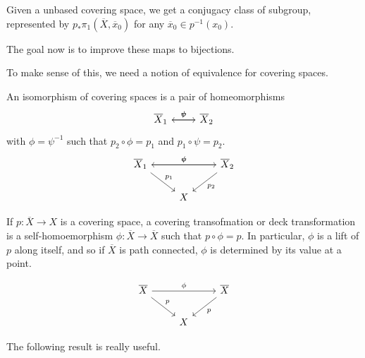 \documentclass{article}
\numberwithin{nthm}{subsection}
\begin{document}
Given a unbased covering space, we get a conjugacy class of subgroup, represented by $p_* \pi_1(\overline{X},\overline{x}_0)$ for any $\overline{x}_0 \in p^{-1}(x_0)$.

The goal now is to improve these maps to bijections.

To make sense of this, we need a notion of equivalence for covering spaces.

\begin{defi}
    An isomorphism of covering spaces is a pair of homeomorphisms
    \begin{equation*}
        \begin{tikzcd}
            \overline{X}_1 \arrow[r, "\phi"] & \overline{X}_2 \arrow[l, "\psi"']
        \end{tikzcd}
    \end{equation*}
    with $\phi = \psi^{-1}$ such that $p_2 \circ \phi = p_1$ and $p_1 \circ \psi = p_2$.
    \begin{equation*}
        \begin{tikzcd}
            \overline{X}_1 \arrow[rr, "\phi"] \arrow[rd, "p_1"] & & \overline{X}_2 \arrow[ll, "\psi"'] \arrow[ld, "p_2"] \\
                                             & X &
        \end{tikzcd}
    \end{equation*}
\end{defi}

\begin{defi}
    If $p: \overline{X} \to X$ is a covering space, a covering transofmation or deck transformation is a self-homoemorphism $\phi: \overline{X} \to \overline{X}$ such that $p \circ \phi = p$.
    In particular, $\phi$ is a lift of $p$ along itself, and so if $\overline{X}$ is path connected, $\phi$ is determined by its value at a point.

    \begin{equation*}
        \begin{tikzcd}
            \overline{X} \arrow[rr, "\phi"] \arrow[rd, "p"] & & \overline{X} \arrow[ld, "p"] \\
                                             & X &
        \end{tikzcd}
    \end{equation*}
\end{defi}

The following result is really useful.
%
\end{document}
